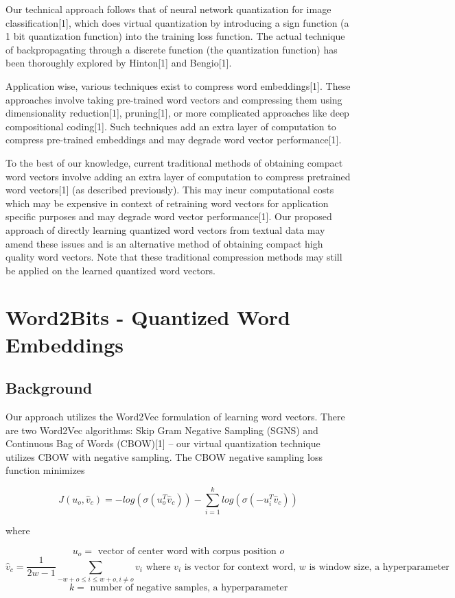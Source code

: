 \documentclass{article} %
\begin{document}
Our technical approach follows that of neural network quantization for
image classification[1], which does virtual quantization by
introducing a sign function (a 1 bit quantization function) into the
training loss function. The actual technique of backpropagating through a
discrete function (the quantization function) has been thoroughly
explored by Hinton[1] and Bengio[1].

Application wise, various techniques exist to compress word
embeddings[1]. These approaches involve taking pre-trained word
vectors and compressing them using dimensionality reduction[1],
pruning[1], or more complicated approaches like deep compositional
coding[1]. Such techniques add an extra layer of computation to
compress pre-trained embeddings and may degrade word vector
performance[1].

To the best of our knowledge, current traditional methods of obtaining
compact word vectors involve adding an extra layer of computation to
compress pretrained word vectors[1] (as described previously). This
may incur computational costs which may be expensive in context of
retraining word vectors for application specific purposes and may
degrade word vector performance[1]. Our proposed approach of directly
learning quantized word vectors from textual data may amend these
issues and is an alternative method of obtaining compact high quality
word vectors. Note that these traditional compression methods may
still be applied on the learned quantized word vectors.

\section{Word2Bits - Quantized Word Embeddings}
\subsection{Background}
Our approach utilizes the Word2Vec formulation of learning word vectors. There
are two Word2Vec algorithms: Skip Gram Negative Sampling (SGNS) and
Continuous Bag of Words (CBOW)[1] -- our virtual quantization
technique utilizes CBOW with negative sampling. The CBOW negative
sampling loss function minimizes

$$
J(u_o, \hat{v}_c) = -log(\sigma(u_o^T\hat{v}_c)) - \sum_{i=1}^{k} log(\sigma(-u_i^T\hat{v}_c))
$$

where

$$
u_o = \mbox{ vector of center word with corpus position } o
$$
$$
\hat{v}_c = \frac{1}{2w-1}\sum_{-w+o \leq i \leq w+o,i \neq o} v_i \mbox{  where } v_i \mbox{ is vector for context word, } w \mbox{ is window size, a hyperparameter}
$$
$$
k = \mbox{ number of negative samples, a hyperparameter}
$$
\end{document}
